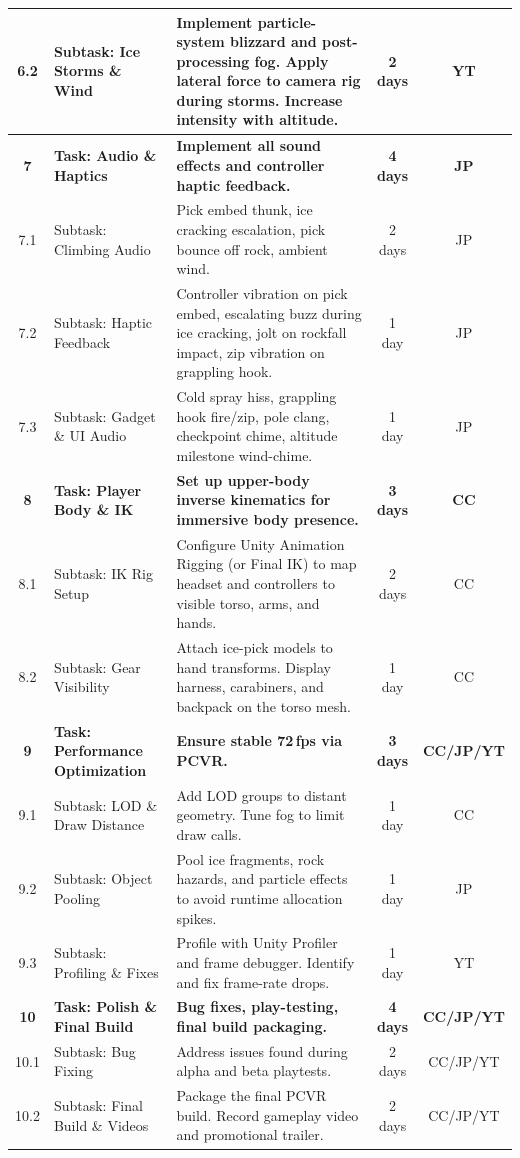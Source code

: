 \documentclass[12pt]{article}
\begin{document}
\begin{longtable}{|c|p{2.8cm}|p{7.2cm}|c|c|}
\hline
6.2 & Subtask: Ice Storms \& Wind & Implement particle-system blizzard and post-processing fog. Apply lateral force to camera rig during storms. Increase intensity with altitude. & 2 days & YT \\
\hline
\textbf{7} & \textbf{Task: Audio \& Haptics} & \textbf{Implement all sound effects and controller haptic feedback.} & \textbf{4 days} & \textbf{JP} \\
\hline
7.1 & Subtask: Climbing Audio & Pick embed thunk, ice cracking escalation, pick bounce off rock, ambient wind. & 2 days & JP \\
\hline
7.2 & Subtask: Haptic Feedback & Controller vibration on pick embed, escalating buzz during ice cracking, jolt on rockfall impact, zip vibration on grappling hook. & 1 day & JP \\
\hline
7.3 & Subtask: Gadget \& UI Audio & Cold spray hiss, grappling hook fire/zip, pole clang, checkpoint chime, altitude milestone wind-chime. & 1 day & JP \\
\hline
\textbf{8} & \textbf{Task: Player Body \& IK} & \textbf{Set up upper-body inverse kinematics for immersive body presence.} & \textbf{3 days} & \textbf{CC} \\
\hline
8.1 & Subtask: IK Rig Setup & Configure Unity Animation Rigging (or Final IK) to map headset and controllers to visible torso, arms, and hands. & 2 days & CC \\
\hline
8.2 & Subtask: Gear Visibility & Attach ice-pick models to hand transforms. Display harness, carabiners, and backpack on the torso mesh. & 1 day & CC \\
\hline
\textbf{9} & \textbf{Task: Performance Optimization} & \textbf{Ensure stable 72\,fps via PCVR.} & \textbf{3 days} & \textbf{CC/JP/YT} \\
\hline
9.1 & Subtask: LOD \& Draw Distance & Add LOD groups to distant geometry. Tune fog to limit draw calls. & 1 day & CC \\
\hline
9.2 & Subtask: Object Pooling & Pool ice fragments, rock hazards, and particle effects to avoid runtime allocation spikes. & 1 day & JP \\
\hline
9.3 & Subtask: Profiling \& Fixes & Profile with Unity Profiler and frame debugger. Identify and fix frame-rate drops. & 1 day & YT \\
\hline
\textbf{10} & \textbf{Task: Polish \& Final Build} & \textbf{Bug fixes, play-testing, final build packaging.} & \textbf{4 days} & \textbf{CC/JP/YT} \\
\hline
10.1 & Subtask: Bug Fixing & Address issues found during alpha and beta playtests. & 2 days & CC/JP/YT \\
\hline
10.2 & Subtask: Final Build \& Videos & Package the final PCVR build. Record gameplay video and promotional trailer. & 2 days & CC/JP/YT \\
\hline
\end{longtable}
\renewcommand{\arraystretch}{1.0}
\end{document}
